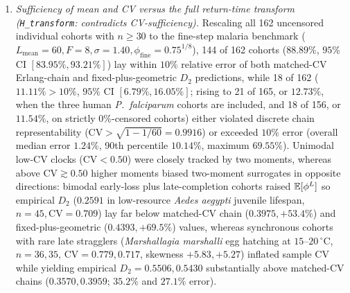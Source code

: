 \begin{enumerate}
\item \emph{Sufficiency of mean and CV versus the full return-time transform (\texttt{H\_transform}: contradicts CV-sufficiency).} Rescaling all 162 uncensored individual cohorts with $n \ge 30$ to the fine-step malaria benchmark ($L_{\mathrm{mean}} = 60, F = 8, \sigma = 1.40, \phi_{\mathrm{fine}} = 0.75^{1/8}$), 144 of 162 cohorts ($88.89\%$, $95\%$ CI $[83.95\%, 93.21\%]$) lay within $10\%$ relative error of both matched-CV Erlang-chain and fixed-plus-geometric $D_2$ predictions, while 18 of 162 ($11.11\% > 10\%$, $95\%$ CI $[6.79\%, 16.05\%]$; rising to 21 of 165, or $12.73\%$, when the three human \emph{P.~falciparum} cohorts are included, and 18 of 156, or $11.54\%$, on strictly $0\%$-censored cohorts) either violated discrete chain representability ($\mathrm{CV} > \sqrt{1 - 1/60} = 0.9916$) or exceeded $10\%$ error (overall median error $1.24\%$, 90th percentile $10.14\%$, maximum $69.55\%$). Unimodal low-CV clocks ($\mathrm{CV} < 0.50$) were closely tracked by two moments, whereas above $\mathrm{CV} \gtrsim 0.50$ higher moments biased two-moment surrogates in opposite directions: bimodal early-loss plus late-completion cohorts raised $\mathbb{E}[\phi^L]$ so empirical $D_2$ ($0.2591$ in low-resource \emph{Aedes aegypti} juvenile lifespan, $n = 45, \mathrm{CV} = 0.709$) lay far below matched-CV chain ($0.3975, +53.4\%$) and fixed-plus-geometric ($0.4393, +69.5\%$) values, whereas synchronous cohorts with rare late stragglers (\emph{Marshallagia marshalli} egg hatching at $15$--$20\,^{\circ}\mathrm{C}$, $n = 36, 35$, $\mathrm{CV} = 0.779, 0.717$, skewness $+5.83, +5.27$) inflated sample CV while yielding empirical $D_2 = 0.5506, 0.5430$ substantially above matched-CV chains ($0.3570, 0.3959$; $35.2\%$ and $27.1\%$ error).
\end{enumerate}

